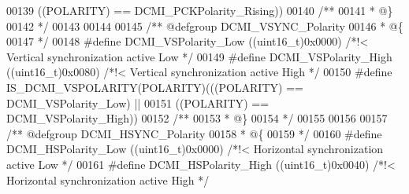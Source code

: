 \begin{DoxyCode}
00139                                       \textcolor{preprocessor}{(}\textcolor{preprocessor}{(}\textcolor{preprocessor}{POLARITY}\textcolor{preprocessor}{)} \textcolor{preprocessor}{==} 
      DCMI_PCKPolarity_Rising\textcolor{preprocessor}{)}\textcolor{preprocessor}{)}
00140 \textcolor{comment}{/**}
00141 \textcolor{comment}{  * @\}}
00142 \textcolor{comment}{  */}
00143 
00144 
00145 \textcolor{comment}{/** @defgroup DCMI\_VSYNC\_Polarity }
00146 \textcolor{comment}{  * @\{}
00147 \textcolor{comment}{  */}
00148 \textcolor{preprocessor}{#}\textcolor{preprocessor}{define} \textcolor{preprocessor}{DCMI\_VSPolarity\_Low}     \textcolor{preprocessor}{(}\textcolor{preprocessor}{(}\textcolor{preprocessor}{uint16\_t}\textcolor{preprocessor}{)}0x0000\textcolor{preprocessor}{)} \textcolor{comment}{/*!< Vertical synchronization active Low */}
00149 \textcolor{preprocessor}{#}\textcolor{preprocessor}{define} \textcolor{preprocessor}{DCMI\_VSPolarity\_High}    \textcolor{preprocessor}{(}\textcolor{preprocessor}{(}\textcolor{preprocessor}{uint16\_t}\textcolor{preprocessor}{)}0x0080\textcolor{preprocessor}{)} \textcolor{comment}{/*!< Vertical synchronization active High */}
00150 \textcolor{preprocessor}{#}\textcolor{preprocessor}{define} \textcolor{preprocessor}{IS\_DCMI\_VSPOLARITY}\textcolor{preprocessor}{(}\textcolor{preprocessor}{POLARITY}\textcolor{preprocessor}{)}\textcolor{preprocessor}{(}\textcolor{preprocessor}{(}\textcolor{preprocessor}{(}\textcolor{preprocessor}{POLARITY}\textcolor{preprocessor}{)} \textcolor{preprocessor}{==} DCMI_VSPolarity_Low\textcolor{preprocessor}{)} \textcolor{preprocessor}{||}
00151                                      \textcolor{preprocessor}{(}\textcolor{preprocessor}{(}\textcolor{preprocessor}{POLARITY}\textcolor{preprocessor}{)} \textcolor{preprocessor}{==} DCMI_VSPolarity_High\textcolor{preprocessor}{)}\textcolor{preprocessor}{)}
00152 \textcolor{comment}{/**}
00153 \textcolor{comment}{  * @\}}
00154 \textcolor{comment}{  */}
00155 
00156 
00157 \textcolor{comment}{/** @defgroup DCMI\_HSYNC\_Polarity }
00158 \textcolor{comment}{  * @\{}
00159 \textcolor{comment}{  */}
00160 \textcolor{preprocessor}{#}\textcolor{preprocessor}{define} \textcolor{preprocessor}{DCMI\_HSPolarity\_Low}     \textcolor{preprocessor}{(}\textcolor{preprocessor}{(}\textcolor{preprocessor}{uint16\_t}\textcolor{preprocessor}{)}0x0000\textcolor{preprocessor}{)} \textcolor{comment}{/*!< Horizontal synchronization active Low */}
00161 \textcolor{preprocessor}{#}\textcolor{preprocessor}{define} \textcolor{preprocessor}{DCMI\_HSPolarity\_High}    \textcolor{preprocessor}{(}\textcolor{preprocessor}{(}\textcolor{preprocessor}{uint16\_t}\textcolor{preprocessor}{)}0x0040\textcolor{preprocessor}{)} \textcolor{comment}{/*!< Horizontal synchronization active High */}

\end{DoxyCode}
